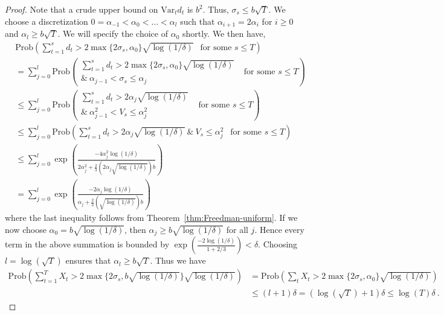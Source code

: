 \documentclass{article}
\newcommand{\var}{\text{Var}}
\newcommand{\Prob}[1]{{\mathrm{Prob} \left(#1\right)}}
\begin{document}
\begin{proof}
Note that a crude upper bound on $\var_t d_t$ is $b^2$. Thus, $\sigma_s \le b\sqrt{T}$. We choose a discretization
$0 = \alpha_{-1} < \alpha_0 < \ldots < \alpha_l$
such that $\alpha_{i+1} = 2\alpha_i$ for $i \ge 0$ and $\alpha_l \ge b\sqrt{T}$. We will specify the choice of
$\alpha_0$ shortly. We then have,
{\allowdisplaybreaks
\begin{align*}
&\Prob{ \sum_{t=1}^s d_t > 2 \max\{ 2 \sigma_s, \alpha_0 \} \sqrt{\log(1/\delta)}  ~~\mbox{ for some } s\leq T } \\
&= \sum_{j=0}^l \Prob{ \begin{matrix}
 \sum_{t=1}^s d_t > 2 \max\{ 2 \sigma_s, \alpha_0 \} \sqrt{ \log(1/\delta)  }  \\
\&\ \alpha_{j-1} < \sigma_s \le \alpha_j
\end{matrix}  ~~\mbox{ for some } s\leq T } \\
&\le \sum_{j=0}^l \Prob{ \begin{matrix}
 \sum_{t=1}^s d_t > 2 \alpha_j \sqrt{ \log(1/\delta) }  \\
\&\ \alpha_{j-1}^2 < V_s \le \alpha_j^2
\end{matrix}  ~~\mbox{ for some } s\leq T} \\
&\le \sum_{j=0}^l \Prob{
\sum_{t=1}^s d_t > 2 \alpha_j \sqrt{ \log(1/\delta) } \ \& \
V_s \le \alpha_j^2   ~~\mbox{ for some } s\leq T}  \\
&\le \sum_{j=0}^l \exp \left(
\frac{-4\alpha_j^2 \log(1/\delta)}
{2\alpha_j^2 + \frac{2}{3}\left( 2 \alpha_j \sqrt{ \log(1/\delta) } \right) b }
\right) \\
&= \sum_{j=0}^l \exp \left(
\frac{-2\alpha_j \log(1/\delta)}
{\alpha_j + \frac{2}{3}\left( \sqrt{ \log(1/\delta) } \right) b }
\right)
\end{align*}
}
where the last inequality follows from Theorem~\ref{thm:Freedman-uniform}.
If we now choose $\alpha_0 = b \sqrt{ \log(1/\delta) }$, then $\alpha_j \ge b \sqrt{ \log(1/\delta) }$
for all $j$. Hence every term in the above summation is bounded by $\exp\left(
\frac{-2\log(1/\delta)}{1 + 2/3}\right) < \delta$. Choosing $l = \log(\sqrt{T})$ ensures that
$\alpha_l \ge b\sqrt{T}$. Thus we have
\begin{align*}
\Prob{  \sum_{t=1}^T X_t > 2 \max\{ 2 \sigma_s, b\sqrt{\log(1/\delta)} \} \sqrt{\log(1/\delta)} }
&= \Prob{ \sum_t X_t > 2 \max\{ 2 \sigma_s, \alpha_0 \} \sqrt{\log(1/\delta)}  } \\
&\le (l+1)\delta = (\log(\sqrt{T})+1)\delta \le \log(T)\delta\ .
\end{align*}
\end{proof}
\end{document}
